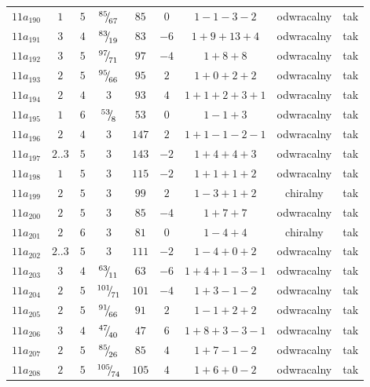 \begin{longtable}{ccccccccc}
$11a_{190}$ & $1$ & $5$ & ${}^{85}{\mskip -5mu/\mskip -3mu}_{67}$ & $85$ & $0$ & $1-1-3-2$ & odwracalny & tak \\
$11a_{191}$ & $3$ & $4$ & ${}^{83}{\mskip -5mu/\mskip -3mu}_{19}$ & $83$ & $-6$ & $1+9+13+4$ & odwracalny & tak \\
$11a_{192}$ & $3$ & $5$ & ${}^{97}{\mskip -5mu/\mskip -3mu}_{71}$ & $97$ & $-4$ & $1+8+8$ & odwracalny & tak \\
$11a_{193}$ & $2$ & $5$ & ${}^{95}{\mskip -5mu/\mskip -3mu}_{66}$ & $95$ & $2$ & $1+0+2+2$ & odwracalny & tak \\
$11a_{194}$ & $2$ & $4$ & $3$ & $93$ & $4$ & $1+1+2+3+1$ & odwracalny & tak \\
$11a_{195}$ & $1$ & $6$ & ${}^{53}{\mskip -5mu/\mskip -3mu}_{8}$ & $53$ & $0$ & $1-1+3$ & odwracalny & tak \\
$11a_{196}$ & $2$ & $4$ & $3$ & $147$ & $2$ & $1+1-1-2-1$ & odwracalny & tak \\
$11a_{197}$ & $2..3$ & $5$ & $3$ & $143$ & $-2$ & $1+4+4+3$ & odwracalny & tak \\
$11a_{198}$ & $1$ & $5$ & $3$ & $115$ & $-2$ & $1+1+1+2$ & odwracalny & tak \\
$11a_{199}$ & $2$ & $5$ & $3$ & $99$ & $2$ & $1-3+1+2$ & chiralny & tak \\
$11a_{200}$ & $2$ & $5$ & $3$ & $85$ & $-4$ & $1+7+7$ & odwracalny & tak \\
$11a_{201}$ & $2$ & $6$ & $3$ & $81$ & $0$ & $1-4+4$ & chiralny & tak \\
$11a_{202}$ & $2..3$ & $5$ & $3$ & $111$ & $-2$ & $1-4+0+2$ & odwracalny & tak \\
$11a_{203}$ & $3$ & $4$ & ${}^{63}{\mskip -5mu/\mskip -3mu}_{11}$ & $63$ & $-6$ & $1+4+1-3-1$ & odwracalny & tak \\
$11a_{204}$ & $2$ & $5$ & ${}^{101}{\mskip -5mu/\mskip -3mu}_{71}$ & $101$ & $-4$ & $1+3-1-2$ & odwracalny & tak \\
$11a_{205}$ & $2$ & $5$ & ${}^{91}{\mskip -5mu/\mskip -3mu}_{66}$ & $91$ & $2$ & $1-1+2+2$ & odwracalny & tak \\
$11a_{206}$ & $3$ & $4$ & ${}^{47}{\mskip -5mu/\mskip -3mu}_{40}$ & $47$ & $6$ & $1+8+3-3-1$ & odwracalny & tak \\
$11a_{207}$ & $2$ & $5$ & ${}^{85}{\mskip -5mu/\mskip -3mu}_{26}$ & $85$ & $4$ & $1+7-1-2$ & odwracalny & tak \\
$11a_{208}$ & $2$ & $5$ & ${}^{105}{\mskip -5mu/\mskip -3mu}_{74}$ & $105$ & $4$ & $1+6+0-2$ & odwracalny & tak \\

\end{longtable}
